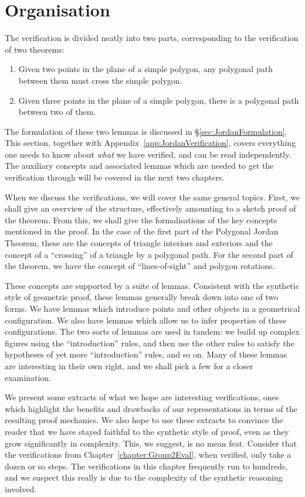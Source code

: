 \section{Organisation}
The verification is divided neatly into two parts, corresponding to the verification of two theorems:
\begin{enumerate}
  \item Given two points in the plane of a simple polygon, any polygonal path between them must cross the simple polygon.
  \item Given three points in the plane of a simple polygon, there is a polygonal path between two of them.
\end{enumerate}

The formulation of these two lemmas is discussed in \S\ref{sec:JordanFormulation}. This section, together with Appendix~\ref{app:JordanVerification}, covers everything one needs to know about \emph{what} we have verified, and can be read independently. The auxiliary concepts and associated lemmas which are needed to get the verification through will be covered in the next two chapters.

When we discuss the verifications, we will cover the same general topics. First, we shall give an overview of the structure, effectively amounting to a sketch proof of the theorem. From this, we shall give the formalisations of the key concepts mentioned in the proof. In the case of the first part of the Polygonal Jordan Theorem, these are the concepts of triangle interiors and exteriors and the concept of a ``crossing'' of a triangle by a polygonal path. For the second part of the theorem, we have the concept of ``lines-of-sight'' and polygon rotations. 

These concepts are supported by a suite of lemmas. Consistent with the synthetic style of geometric proof, these lemmas generally break down into one of two forms. We have lemmas which introduce points and other objects in a geometrical configuration. We also have lemmas which allow us to infer properties of these configurations. The two sorts of lemmas are used in tandem: we build up complex figures using the ``introduction'' rules, and then use the other rules to satisfy the hypotheses of yet more ``introduction'' rules, and so on. Many of these lemmas are interesting in their own right, and we shall pick a few for a closer examination.

We present some extracts of what we hope are interesting verifications, ones which highlight the benefits and drawbacks of our representations in terms of the resulting proof mechanics. We also hope to use these extracts to convince the reader that we have stayed faithful to the synthetic style of proof, even as they grow significantly in complexity. This, we suggest, is no mean feat. Consider that the verifications from Chapter~\ref{chapter:Group2Eval}, when verified, only take a dozen or so steps. The verifications in this chapter frequently run to hundreds, and we suspect this really is due to the complexity of the synthetic reasoning involved.

